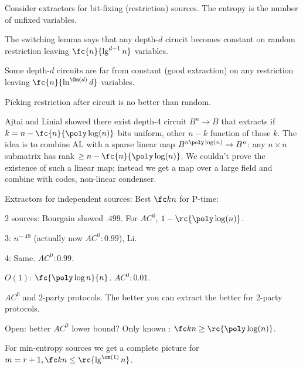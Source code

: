 Consider extractors for bit-fixing (restriction) sources. The entropy is the number of unfixed variables.

The switching lemma says that any depth-$d$ cirucit becomes constant on random restriction leaving $\fc{n}{\lg^{d-1}n}$ variables.

Some depth-$d$ circuits are far from constant (good extraction) on any restriction leaving $\fc{n}{\ln^{\Om(d)}d}$ variables. 

Picking restriction after circuit is no better than random.

Ajtai and Linial showed there exist depth-4 circuit $B^n\to B$ that extracts if $k=n-\fc{n}{\poly \log(n)}$ bits uniform, other $n-k$ function of those $k$.
The idea is to combine AL with a sparse linear map $B^{n\poly\log(n)}\to B^n$: any $n\times n$ submatrix has rank $\ge n-\fc{n}{\poly\log(n)}$. 
We couldn't prove the existence of such a linear map; instead we get a map over a large field and combine with codes, non-linear condenser.

Extractors for independent sources: Best $\fc kn$ for P-time:

2 sources: Bourgain showed $.499$. For $AC^0$, $1-\rc{\poly\log(n)}$.

3: $n^{-.49}$ (actually now $AC^0:0.99$), Li.

4: Same. $AC^0:0.99$.

$O(1)$: $\fc{\poly\log n}{n}$. $AC^0: 0.01$.

$AC^0$ and 2-party protocols. The better you can extract the better for 2-party protocols.

Open: better $AC^0$ lower bound? Only known : $\fc kn \ge \rc{\poly\log(n)}$.


For min-entropy sources we get a complete picture for $m=r+1,\fc kn\le \rc{\lg^{\om(1)}n}$.



